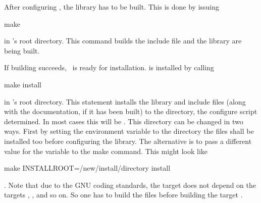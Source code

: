 %                                                                        
%                                                                        
%                                                                        
%                                                                        
%

After configuring \projectname, the library has to be built. This is done by issuing
\begin{console}
make
\end{console}
in \projectname's root directory. This command builds the include file and the library are being built.

If building succeeds, \projectname~is ready for installation. \projectname is installed by calling
\begin{console}
make install
\end{console}
in \projectname's root directory. This statement installs the library and include files (along with the documentation, if it has been built) to the directory, the configure script determined. In most cases this will be . This directory can be changed in two ways. First by setting the environment variable  to the directory the files shall be installed too before configuring the library. The alternative is to pass a different value for the variable  to the make command. This might look like
\begin{console}
make INSTALLROOT=/new/install/directory install
\end{console}
. Note that due to the GNU coding standards, the target  does not depend on the targets , , and so on. So one has to build the files before building the target .

